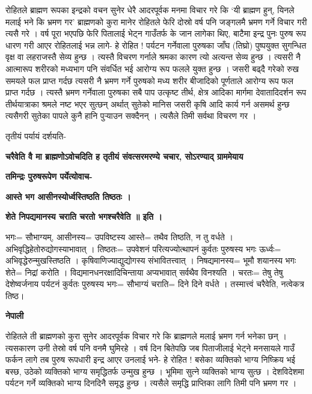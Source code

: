 \documentclass[11pt, a5paper]{article}
\begin{document}
रोहितले ब्राह्मण रूपका इन्द्रको वचन सुनेर धेरै आदरपूर्वक मनमा विचार गरे कि ‘यी ब्राह्मण हुन्, यिनले मलाई भने कि भ्रमण गर’ ब्राह्मणको कुरा मानेर रोहितले फेरि दोस्रो वर्ष पनि जङ्‌गलमै भ्रमण गर्ने विचार गरी त्यसै गरे । वर्ष पूरा भएपछि फेरि पितालाई भेट्न गाउँतर्फ के जान लागेका थिए, बाटैमा इन्द्र पुनः पुरुष रूप धारण गरी आएर रोहितलाई भन्न लागे- हे रोहित ! पर्यटन गर्नेवाला पुरुषका जाँघ (तिघ्रो) पुष्पयुक्त सुगन्धित वृक्ष वा लहराजस्तै सेव्य हुन्छ । त्यस्तै विचरण गर्नाले श्रमका कारण त्यो अत्यन्त सेव्य हुन्छ । त्यसरी नै आत्मारूप शरीरको मध्यभाग पनि संवर्धित भई आरोग्य रूप फलले युक्त हुन्छ । जसरी बढ्दै गरेको रुख समयले फल प्राप्त गर्दछ त्यसरी नै भ्रमण गर्ने पुरुषको मध्य शरीर बीजादिको पूर्णताले आरोग्य रूप फल प्राप्त गर्दछ । त्यस्तै भ्रमण गर्नेवाला पुरुषका सबै पाप उत्कृष्ट तीर्थ, क्षेत्र आदिका मार्गमा देवातादिदर्शन रूप तीर्थयात्राका श्रमले नष्ट भएर सुत्छन् अर्थात् सुतेको मानिस जसरी कृषि आदि कार्य गर्न असमर्थ हुन्छ त्यसैगरी सुतेका पापले कुनै हानि पुर्‍याउन सक्दैनन् । त्यसैले तिमी सर्वथा विचरण गर ।

तृतीयं पर्यायं दर्शयति-

\textbf{चरैवेति वै मा ब्राह्मणोऽवोचदिति ह तृतीयं संवत्सरमरण्ये चचार, सोऽरण्याद् ग्राममेयाय}

\textbf{तमिन्द्रः पुरुषरूपेण पर्येत्योवाच-}

\textbf{आस्ते भग आसीनस्योर्ध्वस्तिष्ठति तिष्ठतः ।}

\textbf{शेते निपद्यमानस्य चराति चरतो भगश्चरैवेति ॥ इति ।}

भगः= सौभाग्यम्, आसीनस्य= उपविष्टस्य आस्ते= तथैव तिष्ठति, न तु वर्धते । अभिवृद्धिहेतोरुद्योगस्याभावात् । तिष्ठतः= उपवेशनं परित्यज्योत्थापनं कुर्वतः पुरुषस्य भगः ऊर्ध्वः= अभिवृद्धेरुन्मुखस्तिष्ठति । कृषिवाणिज्याद्युद्योगस्य संभावितत्त्वात् । निषद्यमानस्य= भूमौ शयानस्य भगः शेते= निद्रां करोति । विद्यमानधनरक्षादिचिन्ताया अप्यभावात् सर्वथैव विनश्यति । चरतः= तेषु तेषु देशेष्वर्जनाय पर्यटनं कुर्वतः पुरुषस्य भगः= सौभाग्यं चराति= दिने दिने वर्धते । तस्मात्त्वं चरैवेति, नत्वेकत्र तिष्ठ।

\textbf{नेपाली}

रोहितले ती ब्राह्मणको कुरा सुनेर आदरपूर्वक विचार गरे कि ब्राह्मणले मलाई भ्रमण गर्न भनेका छन् । त्यसकारण उनी तेस्रो वर्ष पनि वनमै घुमिरहे । वर्ष दिन बितेपछि जब पिताजीलाई भेट्ने मनसायले गाउँ फर्कन लागे तब पुरुष रूपधारी इन्द्र आएर उनलाई भने- हे रोहित ! बसेका व्यक्तिको भाग्य निष्क्रिय भई बस्छ, उठेको व्यक्तिको भाग्य समृद्धितर्फ उन्मुख हुन्छ । भूमिमा सुत्ने व्यक्तिको भाग्य सुत्छ । देशविदेशमा पर्यटन गर्ने व्यक्तिको भाग्य दिनदिनै समृद्ध हुन्छ । त्यसैले समृद्धि प्राप्तिका लागि तिमी पनि भ्रमण गर ।
\end{document}

